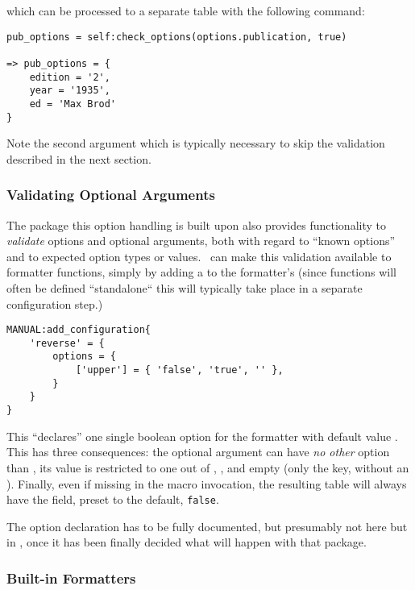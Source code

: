\documentclass[12pt]{scrartcl}
\begin{document}
\noindent which can be processed to a separate table with the following command:

\begin{verbatim}
pub_options = self:check_options(options.publication, true)

=> pub_options = {
	edition = '2',
	year = '1935',
	ed = 'Max Brod'
}
\end{verbatim}

\noindent Note the second argument  which is typically necessary to
skip the validation described in the next section.


\subsubsection{Validating Optional Arguments}
\label{sec:defining:validating-optional-arguments}

The  package this option handling is built upon also
provides functionality to \emph{validate} options and optional arguments, both
with regard to “known options” and to expected option types or values.
\luaformatters\ can make this validation available to formatter
functions, simply by adding a  to the formatter's
 (since functions will often be defined “standalone“ this will typically take place in a separate configuration step.)

\begin{verbatim}
MANUAL:add_configuration{
	'reverse' = {
		options = {
			['upper'] = { 'false', 'true', '' },
		}
	}
}
\end{verbatim}

\noindent This “declares” one single boolean option for the 
formatter with default value .  This has three consequences: the
optional argument can have \emph{no other} option than , its value
is restricted to one out of , , and empty (only the
key, without an \luavar{=}). Finally, even if missing in the macro invocation,
the resulting  table will always have the  field,
preset to the default, \texttt{false}.

\medskip

 The option declaration has to be fully documented, but
presumably not here but in , once it has been finally
decided what will happen with that package.


\subsubsection{Built-in Formatters}
\label{sec:defining:builtin-formatters}
\end{document}
